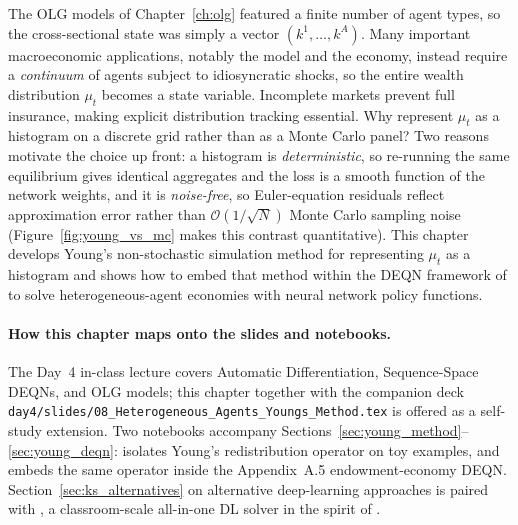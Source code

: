 \documentclass[11pt,a4paper]{report}
\begin{document}
The OLG models of Chapter~\ref{ch:olg} featured a finite number of agent types, so the cross-sectional state was simply a vector $(k^1,\ldots,k^A)$.  Many important macroeconomic applications, notably the \citet{Aiyagari} model and the \citet{krusell1998income} economy, instead require a \emph{continuum} of agents subject to idiosyncratic shocks, so the entire wealth distribution $\mu_t$ becomes a state variable.  Incomplete markets prevent full insurance, making explicit distribution tracking essential.  Why represent $\mu_t$ as a histogram on a discrete grid rather than as a Monte Carlo panel?  Two reasons motivate the choice up front: a histogram is \emph{deterministic}, so re-running the same equilibrium gives identical aggregates and the loss is a smooth function of the network weights, and it is \emph{noise-free}, so Euler-equation residuals reflect approximation error rather than $\mathcal{O}(1/\sqrt N)$ Monte Carlo sampling noise (Figure~\ref{fig:young_vs_mc} makes this contrast quantitative).  This chapter develops Young's non-stochastic simulation method \citep{young2010} for representing $\mu_t$ as a histogram and shows how to embed that method within the DEQN framework of \citet{azinovicDEEPEQUILIBRIUMNETS2022} to solve heterogeneous-agent economies with neural network policy functions.

\paragraph{How this chapter maps onto the slides and notebooks.}
The Day~4 in-class lecture covers Automatic Differentiation, Sequence-Space DEQNs, and OLG models; this chapter together with the companion deck \texttt{day4/slides/08\_Heterogeneous\_Agents\_Youngs\_Method.tex} is offered as a self-study extension.  Two notebooks accompany Sections~\ref{sec:young_method}--\ref{sec:young_deqn}:  isolates Young's redistribution operator on toy examples, and  embeds the same operator inside the Appendix~A.5 endowment-economy DEQN.  Section~\ref{sec:ks_alternatives} on alternative deep-learning approaches is paired with , a classroom-scale all-in-one DL solver in the spirit of \citet{maliar2021deep}.
\end{document}
